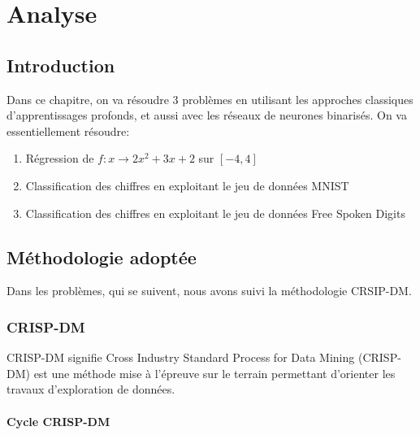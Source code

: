 \chapter{Analyse}

\section{Introduction}

Dans ce chapitre, on va résoudre 3 problèmes en utilisant les approches classiques d'apprentissages profonds, et aussi avec les réseaux de neurones binarisés.
On va essentiellement résoudre:
\begin{enumerate}
	\item Régression de $f:x\rightarrow 2x^2+3x+2$ sur $[-4,4]$
	\item Classification des chiffres en exploitant le jeu de données MNIST
	\item Classification des chiffres en exploitant le jeu de données Free Spoken Digits
\end{enumerate} 
\newpage
\section{Méthodologie adoptée}
Dans les problèmes, qui se suivent, nous avons suivi la méthodologie CRSIP-DM\cite{11}.
\subsection{CRISP-DM}
CRISP-DM signifie Cross Industry Standard Process for Data Mining (CRISP-DM) est une méthode mise à l'épreuve sur le terrain permettant d'orienter les travaux d'exploration de données. 
\subsubsection{Cycle CRISP-DM}

